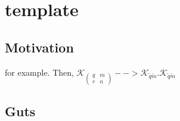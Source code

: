 

\chapter{template}
\label{chap:template}
{}
\date{Sept XX, 2009}

\newcommand{\EK}[4]{\mathcal{K}_{\left(
\begin{smallmatrix}#3&#1\\#4&#2\end{smallmatrix}\right)}}
\newcommand{\mt}{\tilde{m}}
\newcommand{\qt}{\tilde{q}}

\newcommand{\tEK}[4]{\mathcal{K}_{\tilde{#3} \tilde{#1}}}

\beginArtWithToc

\section{Motivation}


for example.  Then, $\EK{m}{n}{q}{r}  --> \mathcal{K}_{\qt \mt}.  \tEK{m}{n}{q}{r}$


\section{Guts}

\EndNoBibArticle
